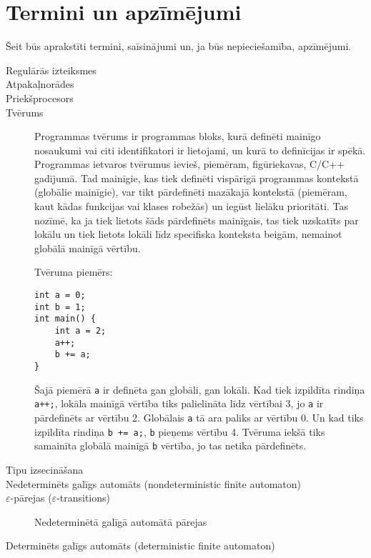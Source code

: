 \section*{Termini un apzīmējumi}
Šeit būs aprakstīti termini, saīsinājumi un, ja būs nepieciešamība, apzīmējumi.

\begin{description}
\item[Regulārās izteiksmes]


\item[Atpakaļnorādes]


\item[Priekšprocesors]


\item[Tvērums]
Programmas tvērums ir programmas bloks, kurā definēti mainīgo nosaukumi vai citi identifikatori ir lietojami, un kurā to definīcijas ir spēkā. Programmas ietvaros tvērumus ievieš, piemēram, figūriekavas, C/C++ gadījumā. Tad mainīgie, kas tiek definēti vispārīgā programmas kontekstā (globālie mainīgie), var tikt pārdefinēti mazākajā kontekstā (piemēram, kaut kādas funkcijas vai klases robežās) un iegūst lielāku prioritāti. Tas nozīmē, ka ja tiek lietots šāds pārdefinēts mainīgais, tas tiek uzskatīts par lokālu un tiek lietots lokāli līdz specifiska konteksta beigām, nemainot globālā mainīgā vērtību.

Tvēruma piemērs:
\begin{verbatim}
int a = 0;
int b = 1;
int main() {
    int a = 2;
    a++;
    b += a;
}
\end{verbatim}
Šajā piemērā \verb|a| ir definēta gan globāli, gan lokāli. Kad tiek izpildīta rindiņa \verb|a++;|, lokāla mainīgā vērtība tiks palielināta līdz vērtībai 3, jo \verb|a| ir pārdefinēts ar vērtību 2. Globālais \verb|a| tā ara paliks ar vērtību 0. Un kad tiks izpildīta rindiņa \verb|b += a;|, \verb|b| pieņems vērtību 4. Tvēruma iekšā tiks samainīta globālā mainīgā \verb|b| vērtība, jo tas netika pārdefinēts.

\item[Tipu izsecināšana]


\item[Nedeterminēts galīgs automāts (nondeterministic finite automaton)]


\item[$\varepsilon$-pārejas ($\varepsilon$-transitions)]
Nedeterminētā galīgā automātā pārejas


\item[Determinēts galīgs automāts (deterministic finite automaton)]



\end{description}
